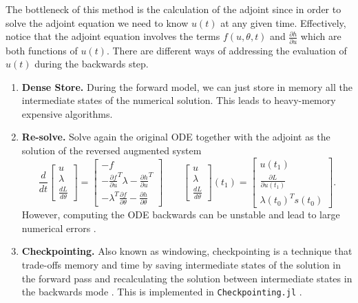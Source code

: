 The bottleneck of this method is the calculation of the adjoint since in order to solve the adjoint equation we need to know $u(t)$ at any given time. 
Effectively, notice that the adjoint equation involves the terms $f(u, \theta, t)$ and $\frac{\partial h}{\partial u}$ which are both functions of $u(t)$. 
There are different ways of addressing the evaluation of $u(t)$ during the backwards step.
\begin{enumerate}[label=(\roman*)]
    \item \textbf{Dense Store.} During the forward model, we can just store in memory all the intermediate states of the numerical solution. 
    This leads to heavy-memory expensive algorithms. 
    \item \textbf{Re-solve.} Solve again the original ODE together with the adjoint as the solution of the reversed augmented system \cite{chen_neural_2019}
    \begin{equation}
    \frac{d}{dt}
    \begin{bmatrix}
       u \\
       \lambda \\
       \frac{dL}{d\theta}
    \end{bmatrix}
    = 
    \begin{bmatrix}
       -f \\
       - \frac{\partial f}{\partial u}^T \lambda - \frac{\partial h}{\partial u}^T \\
       - \lambda^T \frac{\partial f}{\partial \theta} - \frac{\partial h}{\partial \theta}
    \end{bmatrix}
    \qquad 
    \begin{bmatrix}
       u \\
       \lambda \\
       \frac{dL}{d\theta}
    \end{bmatrix}(t_1)
    = 
    \begin{bmatrix}
       u(t_1) \\
       \frac{\partial L}{\partial u(t_1)} \\
       \lambda(t_0)^T s(t_0)
    \end{bmatrix}.
    \end{equation}
    However, computing the ODE backwards can be unstable and lead to large numerical errors \cite{kim_stiff_2021, Zhuang_2020}. 
    \item \textbf{Checkpointing. } Also known as windowing, checkpointing is a technique that trade-offs memory and time by saving intermediate states of the solution in the forward pass and recalculating the solution between intermediate states in the backwards mode \cite{Checkpoiting_2023, griewank2008evaluatingderivatives}. 
    This is implemented in \texttt{Checkpointing.jl} \cite{Checkpoiting_2023}.
\end{enumerate} 

